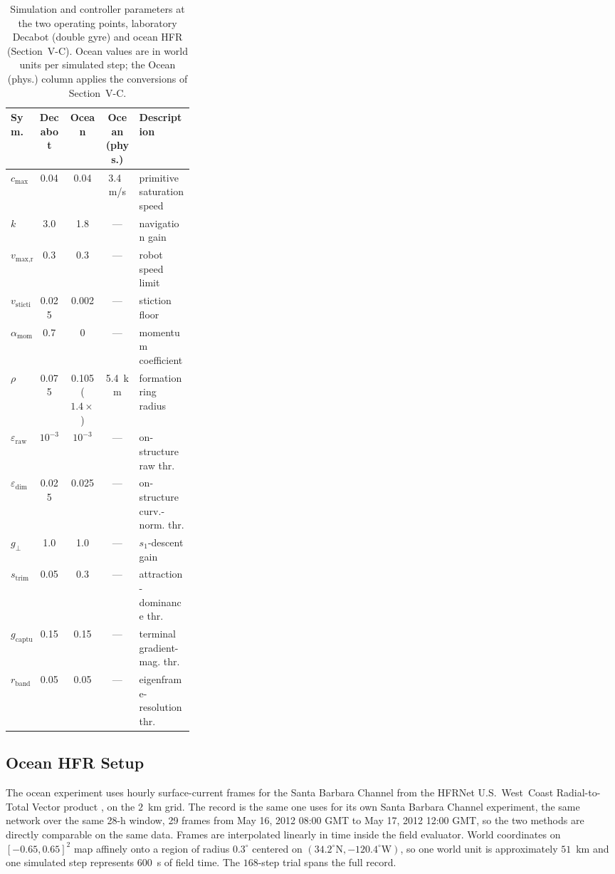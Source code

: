 \documentclass[lettersize,journal]{IEEEtran}
\begin{document}
\begin{table}[!t]
\centering
\caption{Simulation and controller parameters at the two operating
points, laboratory Decabot (double gyre) and ocean HFR
(Section~\mbox{V-C}). Ocean values are in world units per simulated
step; the Ocean (phys.) column applies the conversions of
Section~\mbox{V-C}.}
\label{tab:params}
\scriptsize
\setlength{\tabcolsep}{2.5pt}
\begin{tabular}{@{}lccc>{\raggedright\arraybackslash}p{0.30\linewidth}@{}}
\hline
\textbf{Sym.} & \textbf{Decabot} & \textbf{Ocean} & \textbf{Ocean (phys.)} & \textbf{Description} \\
\hline
$c_{\max}$ & 0.04 & 0.04 & 3.4~m/s & primitive saturation speed \\
$k$ & 3.0 & 1.8 & --- & navigation gain \\
$v_{\text{max,robot}}$ & 0.3 & 0.3 & --- & robot speed limit \\
$v_{\text{stiction}}$ & 0.025 & 0.002 & --- & stiction floor \\
$\alpha_{\text{mom}}$ & 0.7 & 0 & --- & momentum coefficient \\
$\rho$ & 0.075 & 0.105 ($1.4\times$) & 5.4~km & formation ring radius \\
$\varepsilon_{\text{raw}}$ & $10^{-3}$ & $10^{-3}$ & --- & on-structure raw thr. \\
$\varepsilon_{\text{dim}}$ & 0.025 & 0.025 & --- & on-structure curv.-norm. thr. \\
$g_\perp$ & 1.0 & 1.0 & --- & $s_1$-descent gain \\
$s_{\text{trim}}$ & 0.05 & 0.3 & --- & attraction-dominance thr. \\
$g_{\text{capture}}$ & 0.15 & 0.15 & --- & terminal gradient-mag. thr. \\
$r_{\text{band}}$ & 0.05 & 0.05 & --- & eigenframe-resolution thr. \\
\hline
\end{tabular}
\end{table}

\subsection{Ocean HFR Setup}
\label{sec:ocean_sim}

The ocean experiment uses hourly surface-current frames for the Santa
Barbara Channel from the HFRNet U.S.~West~Coast Radial-to-Total Vector
product \cite{41}, on the $2$~km grid. The record is the same one
\cite{17} uses for its own Santa Barbara Channel experiment, the same
network over the same 28-h window, 29 frames from May 16, 2012 08:00
GMT to May 17, 2012 12:00 GMT, so the two methods are directly
comparable on the same data. Frames are interpolated linearly in time
inside the field evaluator. World coordinates on $[-0.65, 0.65]^2$ map
affinely onto a region of radius $0.3^{\circ}$ centered on
$(34.2^{\circ}\mathrm{N}, -120.4^{\circ}\mathrm{W})$, so one world unit
is approximately $51$~km and one simulated step represents $600$~s of
field time. The $168$-step trial spans the full record.
\end{document}
